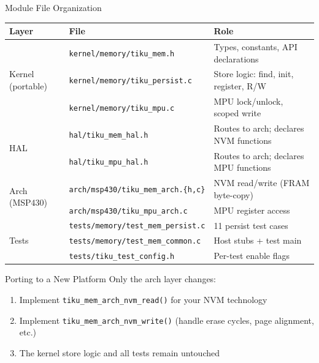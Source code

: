 \documentclass[aspectratio=169, 10pt]{beamer}
\begin{document}
\begin{frame}[fragile]{Module File Organization}
\begin{table}
\centering
\small
\begin{tabular}{@{}lll@{}}
\toprule
\textbf{Layer} & \textbf{File} & \textbf{Role} \\
\midrule
\multirow{3}{*}{Kernel (portable)}
  & \texttt{kernel/memory/tiku\_mem.h} & Types, constants, API declarations \\
  & \texttt{kernel/memory/tiku\_persist.c} & Store logic: find, init, register, R/W \\
  & \texttt{kernel/memory/tiku\_mpu.c} & MPU lock/unlock, scoped write \\
\midrule
\multirow{2}{*}{HAL}
  & \texttt{hal/tiku\_mem\_hal.h} & Routes to arch; declares NVM functions \\
  & \texttt{hal/tiku\_mpu\_hal.h} & Routes to arch; declares MPU functions \\
\midrule
\multirow{2}{*}{Arch (MSP430)}
  & \texttt{arch/msp430/tiku\_mem\_arch.\{h,c\}} & NVM read/write (FRAM byte-copy) \\
  & \texttt{arch/msp430/tiku\_mpu\_arch.c} & MPU register access \\
\midrule
\multirow{3}{*}{Tests}
  & \texttt{tests/memory/test\_mem\_persist.c} & 11 persist test cases \\
  & \texttt{tests/memory/test\_mem\_common.c} & Host stubs + test main \\
  & \texttt{tests/tiku\_test\_config.h} & Per-test enable flags \\
\bottomrule
\end{tabular}
\end{table}

\vspace{0.5em}
\begin{block}{Porting to a New Platform}
Only the arch layer changes:
\begin{enumerate}
  \item Implement \texttt{tiku\_mem\_arch\_nvm\_read()} for your NVM technology
  \item Implement \texttt{tiku\_mem\_arch\_nvm\_write()} (handle erase cycles, page alignment, etc.)
  \item The kernel store logic and all tests remain untouched
\end{enumerate}
\end{block}
\end{frame}
\end{document}
